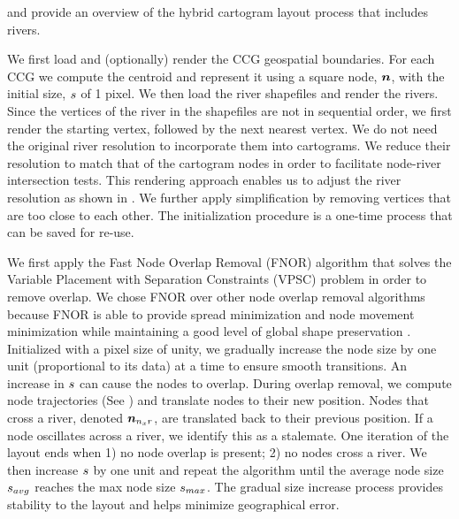  and  provide an overview of the hybrid cartogram layout process that includes rivers.

 We first load and (optionally) render the CCG geospatial boundaries. For each CCG we compute the centroid and represent it using a square node, $ \bm{n} $, with the initial size, $ s $ of 1 pixel. We then load the river shapefiles and render the rivers. Since the vertices of the river in the shapefiles are not in sequential order, we first render the starting vertex, followed by the next nearest vertex. We do not need the original river resolution to incorporate them into cartograms. We reduce their resolution to match that of the cartogram nodes in order to facilitate node-river intersection tests. This rendering approach enables us to adjust the river resolution as shown in . We further apply simplification by removing vertices that are too close to each other. The initialization procedure is a one-time process that can be saved for re-use.


 We first apply the Fast Node Overlap Removal (FNOR) algorithm that solves the Variable Placement with Separation Constraints (VPSC) problem \cite{dwyer2006fast} in order to remove overlap. We chose FNOR over other node overlap removal algorithms because FNOR is able to provide spread minimization and node movement minimization while maintaining a good level of global shape preservation \cite{chen2020Node}. Initialized with a pixel size of unity, we gradually increase the node size by one unit (proportional to its data) at a time to ensure smooth transitions. An increase in $ s $ can cause the nodes to overlap. During overlap removal, we compute node trajectories (See ) and translate nodes to their new position. Nodes that cross a river, denoted $ \bm{n}_{n_{x}r} $, are translated back to their previous position. If a node oscillates across a river, we identify this as a stalemate. One iteration of the layout ends when 1) no node overlap is present; 2) no nodes cross a river. We then increase $ s $ by one unit and repeat the algorithm until the average node size $ s_{avg} $ reaches the max node size $ s_{max} $. The gradual size increase process provides stability to the layout and helps minimize geographical error.

